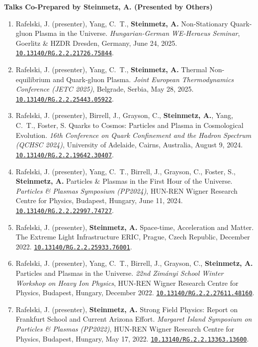 \documentclass[11pt]{article}
\begin{document}
{\large\textbf{Talks Co-Prepared by Steinmetz, A. (Presented by Others)}}

\begin{enumerate}[leftmargin=*,nosep]
    \item Rafelski, J. (presenter), Yang, C.~T., \textbf{Steinmetz, A.} Non-Stationary Quark-gluon Plasma in the Universe. \textit{Hungarian-German WE-Heraeus Seminar}, Goerlitz \& HZDR Dresden, Germany, June 24, 2025. \href{https://doi.org/10.13140/RG.2.2.21726.75844}{\nolinkurl{10.13140/RG.2.2.21726.75844}}.
    \item Rafelski, J. (presenter), Yang, C.~T., \textbf{Steinmetz, A.} Thermal Non-equilibrium and Quark-gluon Plasma. \textit{Joint European Thermodynamics Conference (JETC 2025)}, Belgrade, Serbia, May 28, 2025. \href{https://doi.org/10.13140/RG.2.2.25443.05922}{\nolinkurl{10.13140/RG.2.2.25443.05922}}.
    \item Rafelski, J. (presenter), Birrell, J., Grayson, C., \textbf{Steinmetz, A.}, Yang, C.~T., Foster, S. Quarks to Cosmos: Particles and Plasma in Cosmological Evolution. \textit{16th Conference on Quark Confinement and the Hadron Spectrum (QCHSC 2024)}, University of Adelaide, Cairns, Australia, August 9, 2024. \href{https://doi.org/10.13140/RG.2.2.19642.30407}{\nolinkurl{10.13140/RG.2.2.19642.30407}}.
    \item Rafelski, J. (presenter), Yang, C.~T., Birrell, J., Grayson, C., Foster, S., \textbf{Steinmetz, A.} Particles \& Plasmas in the First Hour of the Universe. \textit{Particles \& Plasmas Symposium (PP2024)}, HUN-REN Wigner Research Centre for Physics, Budapest, Hungary, June 11, 2024. \href{https://doi.org/10.13140/RG.2.2.22997.74727}{\nolinkurl{10.13140/RG.2.2.22997.74727}}.
    \item Rafelski, J. (presenter), \textbf{Steinmetz, A.} Space-time, Acceleration and Matter. The Extreme Light Infrastructure ERIC, Prague, Czech Republic, December 2022. \href{https://doi.org/10.13140/RG.2.2.25933.76001}{\nolinkurl{10.13140/RG.2.2.25933.76001}}.
    \item Rafelski, J. (presenter), Yang, C.~T., Birrell, J., Grayson, C., \textbf{Steinmetz, A.} Particles and Plasmas in the Universe. \textit{22nd Zim\'{a}nyi School Winter Workshop on Heavy Ion Physics}, HUN-REN Wigner Research Centre for Physics, Budapest, Hungary, December 2022. \href{https://doi.org/10.13140/RG.2.2.27611.48160}{\nolinkurl{10.13140/RG.2.2.27611.48160}}.
    \item Rafelski, J. (presenter), \textbf{Steinmetz, A.} Strong Field Physics: Report on Frankfurt School and Current Arizona Effort. \textit{Margaret Island Symposium on Particles \& Plasmas (PP2022)}, HUN-REN Wigner Research Centre for Physics, Budapest, Hungary, May 17, 2022. \href{https://doi.org/10.13140/RG.2.2.13363.13600}{\nolinkurl{10.13140/RG.2.2.13363.13600}}.
\end{enumerate}
\end{document}
